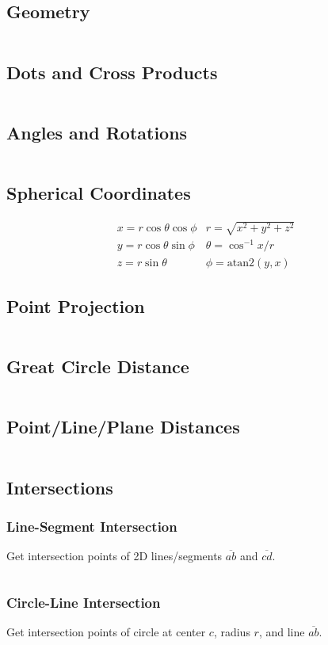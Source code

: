 \documentclass[8pt,a4paper,landscape,oneside]{amsart}
\newcommand{\code}[1]{\inputminted[fontsize=\normalsize,baselinestretch=1]{cpp}{_code/#1}}
\begin{document}
\begin{multicols*}{3}
\section{Geometry}
  \code{geom/compgeom.cpp}
	\subsection{Dots and Cross Products}
    \code{geom/dot-cross.cpp}
  \subsection{Angles and Rotations}
    \code{geom/angles-rots.cpp}
	\subsection{Spherical Coordinates}
    \[
        \begin{array}{cc}
            x = r \cos \theta \cos \phi & r = \sqrt{x^2 + y^2 + z^2} \\
            y = r \cos \theta \sin \phi & \theta = \cos^{-1} x/r \\
            z = r \sin \theta & \phi = \mathrm{atan2}(y,x)
        \end{array}
    \]
	\subsection{Point Projection}
    \code{geom/pt-proj.cpp}
	\subsection{Great Circle Distance}
    \code{geom/great-circle.cpp}
	\subsection{Point/Line/Plane Distances}
    \code{geom/dists.cpp}
	\subsection{Intersections}
    \subsubsection{Line-Segment Intersection}
      Get intersection points of 2D lines/segments $\overline{ab}$ and $\overline{cd}$.
      \code{geom/line-seg-isect.cpp}
    \subsubsection{Circle-Line Intersection}
      Get intersection points of circle at center $c$, radius $r$, and line $\overline{ab}$.
      \code{geom/circ-line-isect.cpp}

\end{multicols*}
\end{document}

